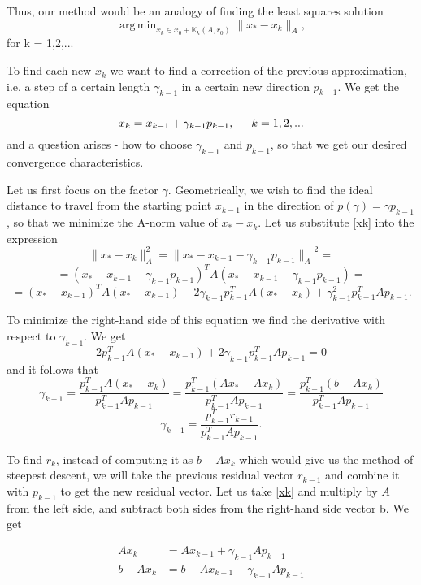 Thus, our method would be an analogy of finding the least squares solution  
\begin{equation}\label{argmin}
    \operatorname{arg\,min}_{x_k \in x_0 + \mathbb{K}_k(A,r_0)} \|x_* - x_k\|_A,
\end{equation}
 for k = 1,2,...

To find each new \(x_k\) we want to find a correction of the previous approximation, i.e. a step of a certain length \(\gamma_{k-1}\) in a certain new direction \(p_{k-1}\). We get the equation
\begin{equation}\label{xk}
    x_k = x_{k-1} + \gamma_{k-1}p_{k-1},\indent k = 1,2,...
\end{equation}
and a question arises - how to choose \(\gamma_{k-1}\) and \(p_{k-1}\), so that we get our desired convergence characteristics.

Let us first focus on the factor \(\gamma\). Geometrically, we wish to find the ideal distance to travel from the starting point \(x_{k-1}\) in the direction of \(p(\gamma) = \gamma p_{k-1}\), so that we minimize the A-norm value of \(x_* - x_k\). Let us substitute \eqref{xk} into the expression
\[\|x_*-x_k\|_A
^2 = {\|x_*-x_{k-1} - \gamma_{k-1} p_{k-1}\|_A}^2 =\] 
\[= (x_*-x_{k-1} - \gamma_{k-1} p_{k-1})^TA(x_*-x_{k-1} - \gamma_{k-1} p_{k-1})=\] 
\[= (x_*-x_{k-1})^TA(x_*-x_{k-1}) - 2 \gamma_{k-1} p_{k-1}^TA(x_*-x_k) + \gamma_{k-1} ^2 p_{k-1}^TAp_{k-1}. \]

To minimize the right-hand side of this equation we find the derivative with respect to \(\gamma_{k-1}\). We get \[ 2p_{k-1}^TA(x_*-x_{k-1}) + 2\gamma_{k-1}p_{k-1}^TAp_{k-1}=0 \]
and it follows that
\[\gamma_{k-1} = \frac{p_{k-1}^TA(x_* - x_k)}{p_{k-1}^TAp_{k-1} } =\frac{p_{k-1}^T(Ax_* - Ax_k)}{p_{k-1}^TAp_{k-1} }=\frac{p_{k-1}^T(b - Ax_k)}{p_{k-1}^TAp_{k-1} }\]
\begin{equation}
    \gamma_{k-1} =\frac{p_{k-1}^Tr_{k-1}}{p_{k-1}^TAp_{k-1} }.
\end{equation}

To find \(r_k\), instead of computing it as \(b - Ax_k\) which would give us the method of steepest descent, we will take the previous residual vector \(r_{k-1}\) and combine it with \(p_{k-1}\) to get the new residual vector.
Let us take \eqref{xk} and multiply by \(A\) from the left side, and subtract both sides from the right-hand side vector b.
We get

\begin{equation}
\begin{split}
    Ax_k &= Ax_{k-1} + \gamma_{k-1}Ap_{k-1}\\
    b - Ax_k &= b -Ax_{k-1} - \gamma_{k-1}Ap_{k-1}
\end{split}  
\end{equation}

